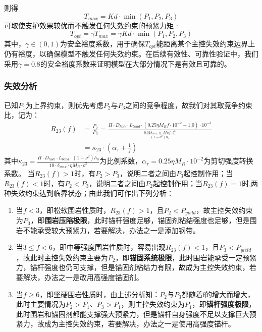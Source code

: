 \documentclass[UTF-8,a4paper,zihao=-4]{ctexart}
\begin{document}
则得\begin{equation}
    T_{max}=Kd\cdot \min(P_1,P_2,P_3)
\end{equation}
可取使支护效果较优而不触发任何失效约束的预紧力矩 :
\begin{equation}
    T_{opt}=\gamma T_{max}=\gamma Kd\cdot \min(P_1,P_2,P_3)
\label{q4-Topt}
\end{equation}
其中，$\gamma\in(0,1)$为安全裕度系数，用于确保$T_{opt}$能距离某个主控失效约束边界上仍有裕度，以确保模型不触发任何失效约束。在后续有效性、可靠性验证中，我们采用$\gamma=0.8$的安全裕度系数来证明模型在大部分情况下是有效且可靠的。

\subsubsection{失效分析}
已知$P_1$为上界约束，则优先考虑$P_2$与$P_3$之间的竞争程度，故我们对其取竞争约束比，记为：
\begin{equation}
\begin{split}
    R_{23}(f) &= \frac{P_2}{P_3} 
         = \frac{\Pi\cdot D_{hole}\cdot L_{bond}\cdot (0.25\eta M_Rf\cdot 10^{-2}+1.0)\cdot 10^{-3}}{\frac{0.01\delta_{max}\cdot \eta\cdot M_Rf\cdot b^2}{(1-\nu^2)h_o}} \\
        &=\kappa_{23}\cdot(\alpha_\tau+\frac{1}{f})
\end{split}
\end{equation}
其中$\kappa_{23}=\frac{\Pi\cdot D_{hole}\cdot L_{bond}\cdot (1-\nu^2)h_0}{10\cdot \delta_{max}\cdot \eta M_R\cdot b^2}$为比例系数，$\alpha_\tau=0.25\eta M_R\cdot 10^{-2}$为剪切强度转换系数。
当$R_{23}(f)>1$时，有$P_2>P_3$，说明二者之间由$P_3$起控制作用；当$R_{23}(f)<1$时，有$P_2<P_3$，说明二者之间由$P_2$起控制作用；当$R_{23}(f)=1$时,两种失效约束达到临界状态；由此我们可作出下列分析：
\begin{enumerate}
    \item 当$f<3$，即松软围岩性质时，$R_{23}(f)>1$，且$P_2<P_{yield}$，故主控失效约束为$P_3$，即\textbf{围岩压陷极限}，此时锚杆强度足够，锚固剂粘结强度也足够，但是围岩不能承受较大预紧力，若要解决，办法之一是添加钢带。

    \item 当$3\le f < 6$，即中等强度围岩性质时，容易出现$R_{23}(f)<1$，且$P_3<P_{yield}$，故此时主控失效约束主要为$P_2$，即\textbf{锚固系统极限}，此时围岩能承受一定预紧力，锚杆强度也仍可支撑，但是锚固剂粘结力有限，故成为主控失效约束，若要解决，办法之一是改用高强度锚固剂。

    \item 当$f\ge 6$，即坚硬围岩性质时，由上述分析知：$P_2$与$P_3$都随着f的增大而增大，此时主要情况为$P_2>P_1$、$P_3>P_1$，则主控失效约束为$P_1$，即\textbf{锚杆强度极限}，此时围岩和锚固剂都能支撑强大预紧力，但是锚杆自身强度不足以支撑巨大预紧力，故成为主控失效约束，若要解决，办法之一是使用高强度锚杆。
    
\end{enumerate}
\end{document}

